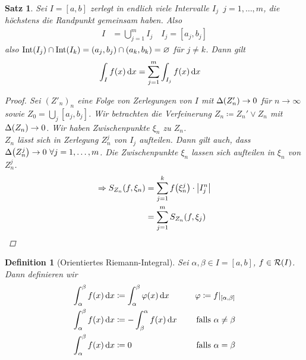 \documentclass[11pt, twoside, a4paper]{article}
\theoremstyle{plain}
\newtheorem{definition}[blockelement]{Definition}
\newtheorem{satz}[blockelement]{Satz}
\numberwithin{equation}{subsection}
\newcommand{\pair}[1]{\left(#1\right)}
\newcommand{\of}[1]{\mathopen{}\mathclose{}\bgroup\left(#1\aftergroup\egroup\right)}
\newcommand{\abs}[1]{\left\lvert#1\right\rvert}
\newcommand{\interv}[1]{\left[#1\right]}
\newcommand{\impl}[0]{\Rightarrow{}}
\newcommand{\fromto}{\rightarrow{}}
\renewcommand{\emptyset}{\varnothing}
\newcommand{\dif}{\mathop{}\!\mathrm{d}}
\newcommand{\ntoinf}[0]{n\fromto\infty}
\newcommand{\mR}{\mathcal{R}}
\begin{document}
    \begin{satz} %
        \label{satz:temp-2.2}
        Sei $I=\interv{a, b}$ zerlegt in endlich viele Intervalle $I_j$~$j=1,\dots, m$, die höchstens die Randpunkt gemeinsam haben. Also
        \begin{align*}
            I &= \bigcup_{j=1}^{m} I_j\quad I_j = \interv{a_j, b_j}
        \end{align*}
        also $\text{Int}\of{I_j} \cap \text{Int}\of{I_k} = \pair{a_j, b_j}\cap\pair{a_k, b_k} = \emptyset$ für $j\neq k$. Dann gilt
        \begin{align*}
            \int_{I}^{} f\of{x} \dif x &= \sum_{j=1}^{m} \int_{I_j}^{} f\of{x} \dif x
        \end{align*}
        \begin{proof}
            Sei $\pair{Z'_n}_n$ eine Folge von Zerlegungen von $I$ mit $\Delta\of{Z'_n}\fromto 0$ für $\ntoinf$ sowie $Z_0 = \bigcup_j \interv{a_j, b_j}$. Wir betrachten die Verfeinerung $Z_n\coloneqq Z_n' \lor Z_n$ mit $\Delta\of{Z_n}\fromto 0$. Wir haben Zwischenpunkte $\xi_n$ zu $Z_n$.\\
            $Z_n$ lässt sich in Zerlegung $Z_n^j$ von $I_j$ aufteilen. Dann gilt auch, dass $\Delta\of{Z_n^j}\fromto 0~\forall j=1, \dots, m$. Die Zwischenpunkte $\xi_n$ lassen sich aufteilen in $\xi_n$ von $Z_n^j$.
            \begin{align*}
                \impl S_{Z_n}\of{f, \xi_n} &= \sum_{j=1}^{k} f\of{\xi_n^j}\cdot\abs{I_j^n}\\
                &= \sum_{j=1}^{m} S_{Z_n}\of{f, \xi_j}\qedhere
            \end{align*}
        \end{proof}
    \end{satz}

    \begin{definition}[Orientiertes Riemann-Integral]
        Sei $\alpha, \beta\in I = \interv{a,b}$, $f\in\mR\of{I}$. Dann definieren wir
        \begin{alignat*}{2}
            \int_{\alpha}^{\beta} f\of{x} \dif x&\coloneqq \int_{\alpha}^{\beta} \varphi\of{x}\dif x  &\quad \varphi \coloneqq f\vert_{\interv{\alpha, \beta}} \\
            \int_{\alpha}^{\beta} f\of{x} \dif x&\coloneqq -\int_{\beta}^{\alpha} f\of{x} \dif x &\quad\text{ falls } \alpha \neq \beta\\
            \int_{\alpha}^{\beta} f\of{x} \dif x&\coloneqq 0 &\quad\text{ falls } \alpha = \beta\\
        \end{alignat*}
    \end{definition}
\end{document}
